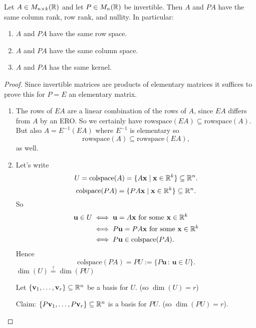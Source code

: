 \documentclass[10pt, a4paper]{article}
\newcommand{\mbf}[1]{\mathbf{#1}}
\begin{document}
\begin{proposition}
    Let $A \in M_{n \times k}(\mathbb{R})$ and let $P \in M_n(\mathbb{R})$ be invertible.
    Then $A$ and $PA$ have the same column rank,
    row rank,
    and nullity.
    In particular:
    \begin{enumerate}[label = (\roman*)]
        \item $A$ and $PA$ have the same row space.
        \item $A$ and $PA$ have the same column space.
        \item $A$ and $PA$ has the same kernel.
    \end{enumerate}
    \begin{proof}
        Since invertible matrices are products of elementary matrices it suffices to prove this for $P = E$ an elementary matrix.
        \begin{enumerate}[label = (\roman*)]
            \item The rows of $EA$ are a linear combination of the rows of $A$,
            since $EA$ differs from $A$ by an ERO.
            So we certainly have $\mathrm{rowspace}(EA) \subseteq \mathrm{rowspace}(A)$.
            But also $A = E ^ {-1}(EA)$ where $E ^ {-1}$ is elementary so
            \[
            \mathrm{rowspace}(A) \subseteq \mathrm{rowspace}(EA),
            \]
            as well.
            
            \item Let's write
            \[
            U = \mathrm{colspace}(A) = \{A\mbf{x}\mid \mbf{x} \in \R ^ k\} \subseteq \R ^ n.
            \]
            \[
            \mathrm{colspace}(PA) = \{PA\mbf{x} \mid \mbf{x} \in \R ^ k\} \subseteq \R ^ n.
            \]
            So
            \begin{align*}
                \mbf{u} \in U &\iff \mbf{u} = A\mbf{x}\text{ for some $\mbf{x} \in \R ^ k$} \\
                &\iff P\mbf{u} = PA\mbf{x}\text{ for some $\mbf{x} \in \R ^ k$} \\
                &\iff P\mbf{u} \in \mathrm{colspace}(PA).
            \end{align*}
            Hence
            \[
            \mathrm{colspace}(PA) = PU := \{P\mbf{u}\,:\,\mbf{u} \in U\}.
            \]
            $\dim{(U)} \overset{?}{=} \dim{(PU)}$

            Let $\{\mbf{v}_1, \dotsc, \mbf{v}_r\} \subseteq \R ^ n$ be a basis for $U$.
            (so $\dim(U) = r$)
            
            Claim:
            $\{P\mbf{v}_1, \dotsc, P\mbf{v}_r\} \subseteq \R ^ n$ is a basis for $PU$.
            (so $\dim(PU) = r$).
                

\end{enumerate}
\end{proof}
\end{proposition}
\end{document}
